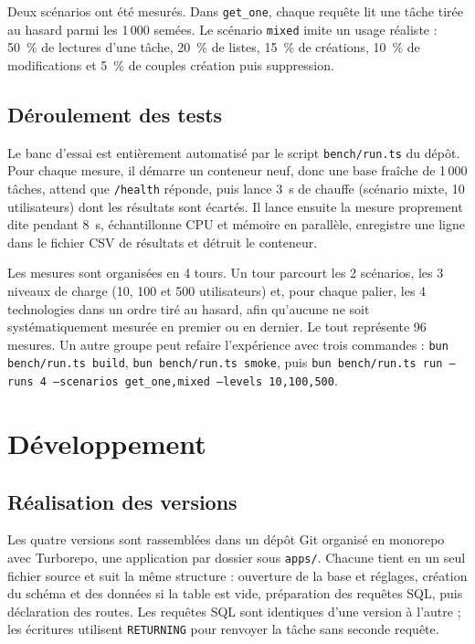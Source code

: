 \documentclass[conference,a4paper]{IEEEtran}
\begin{document}
Deux scénarios ont été mesurés. Dans \texttt{get\_one}, chaque requête
lit une tâche tirée au hasard parmi les 1\,000 semées. Le scénario
\texttt{mixed} imite un usage réaliste : 50~\% de lectures d'une tâche,
20~\% de listes, 15~\% de créations, 10~\% de modifications et 5~\% de
couples création puis suppression.

\subsection{Déroulement des tests}
Le banc d'essai est entièrement automatisé par le script
\texttt{bench/run.ts} du dépôt. Pour chaque mesure, il démarre un
conteneur neuf, donc une base fraîche de 1\,000 tâches, attend que
\texttt{/health} réponde, puis lance 3~s de chauffe (scénario mixte,
10 utilisateurs) dont les résultats sont écartés. Il lance ensuite la
mesure proprement dite pendant 8~s, échantillonne CPU et mémoire en
parallèle, enregistre une ligne dans le fichier CSV de résultats et
détruit le conteneur.

Les mesures sont organisées en 4 tours. Un tour parcourt les
2 scénarios, les 3 niveaux de charge (10, 100 et 500 utilisateurs) et,
pour chaque palier, les 4 technologies dans un ordre tiré au hasard,
afin qu'aucune ne soit systématiquement mesurée en premier ou en
dernier. Le tout représente 96 mesures. Un autre groupe peut refaire
l'expérience avec trois commandes : \texttt{bun bench/run.ts build},
\texttt{bun bench/run.ts smoke}, puis
\texttt{bun bench/run.ts run --runs 4 --scenarios get\_one,mixed
--levels 10,100,500}.

\section{Développement}
\subsection{Réalisation des versions}
Les quatre versions sont rassemblées dans un dépôt Git organisé en
monorepo avec Turborepo, une application par dossier sous
\texttt{apps/}. Chacune tient en un seul fichier source et suit la même
structure : ouverture de la base et réglages, création du schéma et des
données si la table est vide, préparation des requêtes SQL, puis
déclaration des routes. Les requêtes SQL sont identiques d'une version à
l'autre ; les écritures utilisent \texttt{RETURNING} pour renvoyer la
tâche sans seconde requête.
\end{document}
